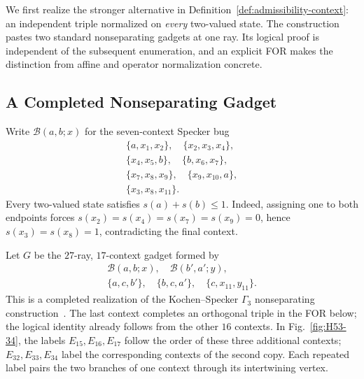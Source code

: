 \documentclass[aps,pra,reprint,superscriptaddress,longbibliography,nofootinbib,floatfix,10pt]{revtex4-2}
\theoremstyle{definition}\newtheorem{definition}[theorem]{Definition}
\theoremstyle{remark}\newtheorem{remark}[theorem]{Remark}
\begin{document}
We first realize the stronger alternative in Definition~\ref{def:admissibility-context}: an independent triple normalized on \emph{every} two-valued state. The construction pastes two standard nonseparating gadgets at one ray. Its logical proof is independent of the subsequent enumeration, and an explicit FOR makes the distinction from affine and operator normalization concrete.

\subsection{A Completed Nonseparating Gadget}

Write $\mathcal B(a,b;x)$ for the seven-context Specker bug
\begin{equation}\label{eq:H53-bug}
\begin{gathered}
\{a,x_1,x_2\},\quad\{x_2,x_3,x_4\},\\
\{x_4,x_5,b\},\quad\{b,x_6,x_7\},\\
\{x_7,x_8,x_9\},\quad\{x_9,x_{10},a\},\\
\{x_3,x_8,x_{11}\}.
\end{gathered}
\end{equation}
Every two-valued state satisfies $s(a)+s(b)\le1$. Indeed, assigning one to both endpoints forces $s(x_2)=s(x_4)=s(x_7)=s(x_9)=0$, hence $s(x_3)=s(x_8)=1$, contradicting the final context.

Let $G$ be the $27$-ray, $17$-context gadget formed by
\begin{equation}\label{eq:H53-G}
\begin{gathered}
\mathcal B(a,b;x),\quad\mathcal B(b',a';y),\\
\{a,c,b'\},\quad\{b,c,a'\},\quad\{c,x_{11},y_{11}\}.
\end{gathered}
\end{equation}
This is a completed realization of the Kochen--Specker $\Gamma_3$ nonseparating construction~\cite{kochen1,svozil2018nonseparating}. The last context completes an orthogonal triple in the FOR below; the logical identity already follows from the other $16$ contexts. In Fig.~\ref{fig:H53-34}, the labels $E_{15},E_{16},E_{17}$ follow the order of these three additional contexts; $E_{32},E_{33},E_{34}$ label the corresponding contexts of the second copy. Each repeated label pairs the two branches of one context through its intertwining vertex.
\end{document}
